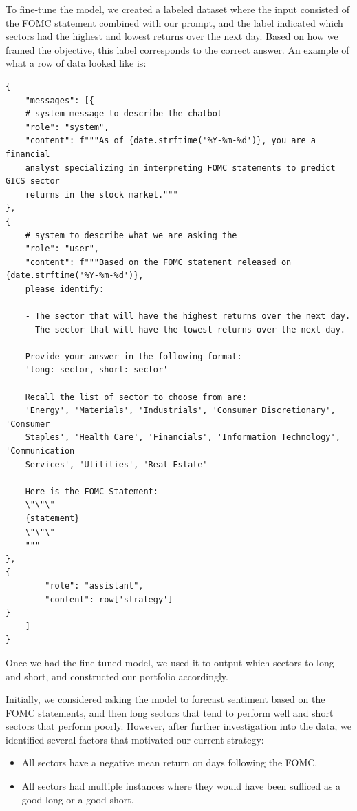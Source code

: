 \documentclass[11pt]{article}
\begin{document}
    To fine-tune the model, we created a labeled dataset where the input consisted of the FOMC 
statement combined with our prompt, and the label indicated which sectors had the highest 
and lowest returns over the next day. Based on how we framed the objective, this label 
corresponds to the correct answer. An example of what a row of data looked like is:

\begin{verbatim}
{
    "messages": [{
    # system message to describe the chatbot
    "role": "system",
    "content": f"""As of {date.strftime('%Y-%m-%d')}, you are a financial 
    analyst specializing in interpreting FOMC statements to predict GICS sector 
    returns in the stock market."""
},
{   
    # system to describe what we are asking the
    "role": "user",
    "content": f"""Based on the FOMC statement released on {date.strftime('%Y-%m-%d')}, 
    please identify:

    - The sector that will have the highest returns over the next day.
    - The sector that will have the lowest returns over the next day.

    Provide your answer in the following format:
    'long: sector, short: sector'

    Recall the list of sector to choose from are:
    'Energy', 'Materials', 'Industrials', 'Consumer Discretionary', 'Consumer 
    Staples', 'Health Care', 'Financials', 'Information Technology', 'Communication 
    Services', 'Utilities', 'Real Estate' 

    Here is the FOMC Statement:
    \"\"\"
    {statement}
    \"\"\"
    """
},
{
        "role": "assistant", 
        "content": row['strategy']
}
    ]
}
\end{verbatim}

Once we had the fine-tuned model, we used it to output which sectors to long and short, 
and constructed our portfolio accordingly.

Initially, we considered asking the model to forecast sentiment based on the FOMC statements, 
and then long sectors that tend to perform well and short sectors that perform poorly. 
However, after further investigation into the data, we identified several factors that 
motivated our current strategy:

\begin{itemize}
  \item All sectors have a negative mean return on days following the FOMC.
  \item All sectors had multiple instances where they would have been sufficed as a good long 
  or a good short.
\end{itemize}
\end{document}

